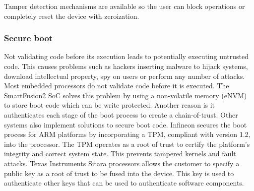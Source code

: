 Tamper detection mechanisms are available so the user can block operations or completely reset the device with zeroization.

\subsubsection*{Secure boot}
Not validating code before its execution leads to potentially executing untrusted code. This causes problems such as hackers inserting malware to hijack systems, download intellectual property, spy on users or perform any number of attacks.
Most embedded processors do not validate code before it is executed. The SmartFusion2 \ac{SoC} solves this problem by using a non-volatile memory (eNVM) to store boot code which can be write protected. Another reason is it authenticates each stage of the boot process to create a chain-of-trust.
Other systems also implement solutions to secure boot code. Infineon secures the boot process for ARM platforms by incorporating a \ac{TPM}, compliant with version 1.2, into the processor. The \ac{TPM} operates as a root of trust to certify the platform's integrity and correct system state. This prevents tampered kernels and fault attacks.
Texas Instruments Sitara processors allows the customer to specify a public key as a root of trust to be fused into the device. This key is used to authenticate other keys that can be used to authenticate software components.

